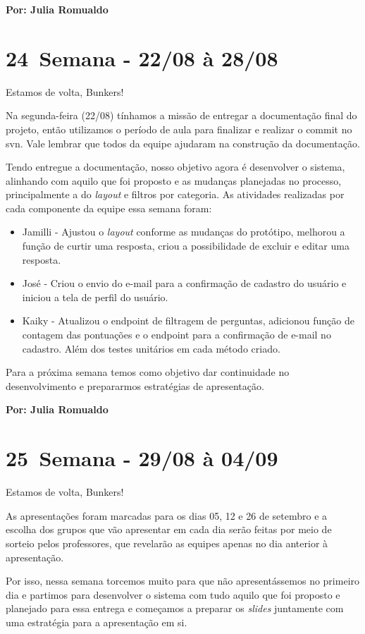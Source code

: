\textbf{Por: Julia Romualdo}

\section{24\textordfeminine \, Semana - 22/08 à 28/08}
Estamos de volta, Bunkers!

Na segunda-feira (22/08) tínhamos a missão de entregar a documentação final do projeto, então utilizamos o período de aula para finalizar e realizar o commit no \acs{svn}. Vale lembrar que todos da equipe ajudaram na construção da documentação. 

Tendo entregue a documentação, nosso objetivo agora é desenvolver o sistema, alinhando com aquilo que foi proposto e as mudanças planejadas no processo, principalmente a do \textit{layout} e filtros por categoria. As atividades realizadas por cada componente da equipe essa semana foram:

\begin{itemize}
    \item Jamilli - Ajustou o \textit{layout} conforme as mudanças do protótipo, melhorou a função de curtir uma resposta, criou a possibilidade de excluir e editar uma resposta. 
    \item José - Criou o envio do e-mail para a confirmação de cadastro do usuário e iniciou a tela de perfil do usuário.
    \item Kaiky - Atualizou o \gls{endpoint} de filtragem de perguntas, adicionou função de contagem das pontuações e o \gls{endpoint} para a confirmação de e-mail no cadastro. Além dos testes unitários em cada método criado.
\end{itemize}

Para a próxima semana temos como objetivo dar continuidade no desenvolvimento e prepararmos estratégias de apresentação.

\textbf{Por: Julia Romualdo}

\section{25\textordfeminine \, Semana - 29/08 à 04/09}
Estamos de volta, Bunkers!

As apresentações foram marcadas para os dias 05, 12 e 26 de setembro e a escolha dos grupos que vão apresentar em cada dia serão feitas por meio de sorteio pelos professores, que revelarão as equipes apenas no dia anterior à apresentação.

Por isso, nessa semana torcemos muito para que não apresentássemos no primeiro dia e partimos para desenvolver o sistema com tudo aquilo que foi proposto e planejado para essa entrega e começamos a preparar os \textit{slides} juntamente com uma estratégia para a apresentação em si.

